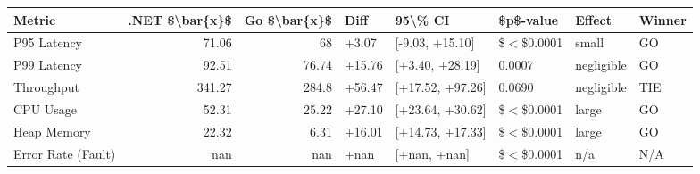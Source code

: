 \begin{tabular}{lrrlllll}
\toprule
 Metric             &   .NET \$\textbackslash{}bar\{x\}\$ &   Go \$\textbackslash{}bar\{x\}\$ & Diff   & 95\textbackslash{}\% CI          & \$p\$-value   & Effect     & Winner   \\
\midrule
 P95 Latency        &            71.06 &          68    & +3.07  & [-9.03, +15.10]  & \$\ensuremath{<}\$0.0001   & small      & GO       \\
 P99 Latency        &            92.51 &          76.74 & +15.76 & [+3.40, +28.19]  & 0.0007      & negligible & GO       \\
 Throughput         &           341.27 &         284.8  & +56.47 & [+17.52, +97.26] & 0.0690      & negligible & TIE      \\
 CPU Usage          &            52.31 &          25.22 & +27.10 & [+23.64, +30.62] & \$\ensuremath{<}\$0.0001   & large      & GO       \\
 Heap Memory        &            22.32 &           6.31 & +16.01 & [+14.73, +17.33] & \$\ensuremath{<}\$0.0001   & large      & GO       \\
 Error Rate (Fault) &           nan    &         nan    & +nan   & [+nan, +nan]     & \$\ensuremath{<}\$0.0001   & n/a        & N/A      \\
\bottomrule
\end{tabular}